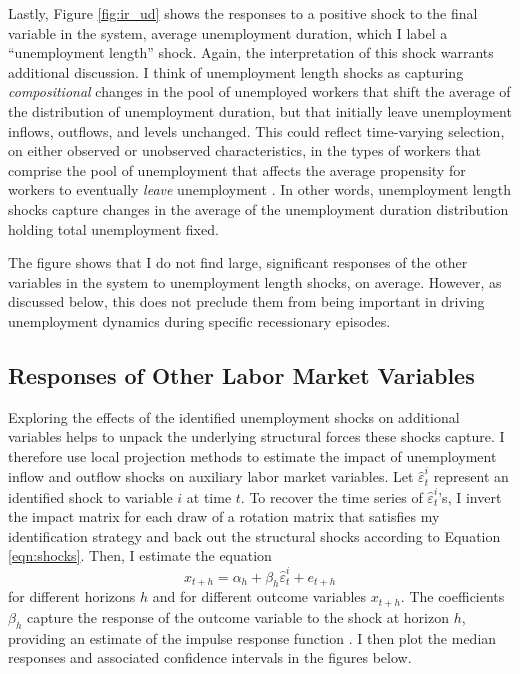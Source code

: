 \documentclass[12pt]{article}
\begin{document}
Lastly, Figure \ref{fig:ir_ud} shows the responses to a positive shock to the final variable in the system, average unemployment duration, which I label a ``unemployment length'' shock. Again, the interpretation of this shock warrants additional discussion. I think of unemployment length shocks as capturing \textit{compositional} changes in the pool of unemployed workers that shift the average of the distribution of unemployment duration, but that initially leave unemployment inflows, outflows, and levels unchanged. This could reflect time-varying selection, on either observed or unobserved characteristics, in the types of workers that comprise the pool of unemployment that affects the average propensity for workers to eventually \textit{leave} unemployment \citep{Ahn:2022aa, Gregory:2025aa}. In other words, unemployment length shocks capture changes in the average of the unemployment duration distribution holding total unemployment fixed. 

The figure shows that I do not find large, significant responses of the other variables in the system to unemployment length shocks, on average. However, as discussed below, this does not preclude them from being important in driving unemployment dynamics during specific recessionary episodes.

\subsection{Responses of Other Labor Market Variables}

Exploring the effects of the identified unemployment shocks on additional variables helps to unpack the underlying structural forces these shocks capture. I therefore use local projection methods \citep{Jorda:2005aa} to estimate the impact of unemployment inflow and outflow shocks on auxiliary labor market variables. Let $\hat \varepsilon^i_t$ represent an identified shock to variable $i$ at time $t$. To recover the time series of $\hat \varepsilon^i_t$'s, I invert the impact matrix for each draw of a rotation matrix that satisfies my identification strategy and back out the structural shocks according to Equation \ref{eqn:shocks}. Then, I estimate the equation
\begin{equation}\label{eqn:lp}
x_{t+h} = \alpha_h + \beta_h \hat \varepsilon^i_t + e_{t+h}
\end{equation}
for different horizons $h$ and for different outcome variables $x_{t+h}$. The coefficients $\beta_h$ capture the response of the outcome variable to the shock at horizon $h$, providing an estimate of the impulse response function \citep{Plagborg:2021aa}. I then plot the median responses and associated confidence intervals in the figures below.
\end{document}
